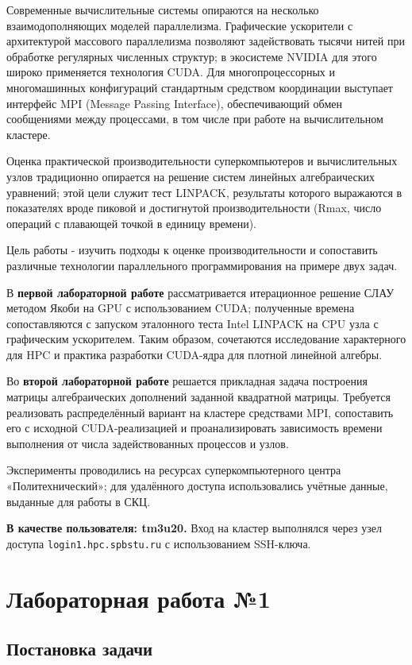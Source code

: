 \documentclass[areasetadvanced]{scrartcl}
\begin{document}
Современные вычислительные системы опираются на несколько взаимодополняющих моделей параллелизма. Графические ускорители с архитектурой массового параллелизма позволяют задействовать тысячи нитей при обработке регулярных численных структур; в экосистеме NVIDIA для этого широко применяется технология CUDA. Для многопроцессорных и многомашинных конфигураций стандартным средством координации выступает интерфейс MPI (Message Passing Interface), обеспечивающий обмен сообщениями между процессами, в том числе при работе на вычислительном кластере.

Оценка практической производительности суперкомпьютеров и вычислительных узлов традиционно опирается на решение систем линейных алгебраических уравнений; этой цели служит тест LINPACK, результаты которого выражаются в показателях вроде пиковой и достигнутой производительности (Rmax, число операций с плавающей точкой в единицу времени).

Цель работы - изучить подходы к оценке производительности и сопоставить различные технологии параллельного программирования на примере двух задач.

В \textbf{первой лабораторной работе} рассматривается итерационное решение СЛАУ методом Якоби на GPU с использованием CUDA; полученные времена сопоставляются с запуском эталонного теста Intel LINPACK на CPU узла с графическим ускорителем. Таким образом, сочетаются исследование характерного для HPC и практика разработки CUDA-ядра для плотной линейной алгебры.

Во \textbf{второй лабораторной работе} решается прикладная задача построения матрицы алгебраических дополнений заданной квадратной матрицы. Требуется реализовать распределённый вариант на кластере средствами MPI, сопоставить его с исходной CUDA-реализацией и проанализировать зависимость времени выполнения от числа задействованных процессов и узлов.

Эксперименты проводились на ресурсах суперкомпьютерного центра «Политехнический»; для удалённого доступа использовались учётные данные, выданные для работы в СКЦ.

\textbf{В качестве пользователя: tm3u20.} Вход на кластер выполнялся через узел доступа \texttt{login1.hpc.spbstu.ru} с использованием SSH-ключа.

\newpage
\section{Лабораторная работа №1}

\subsection{Постановка задачи}
\end{document}
